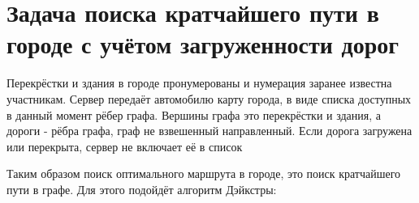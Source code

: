 \section{Задача поиска кратчайшего пути в городе с учётом загруженности дорог}

Перекрёстки и здания в городе пронумерованы и нумерация заранее известна участникам. Сервер передаёт автомобилю карту города, в виде списка доступных в данный момент рёбер графа. Вершины графа это перекрёстки и здания, а дороги - рёбра графа, граф не взвешенный направленный. Если дорога загружена или перекрыта, сервер не включает её в список

Таким образом поиск оптимального маршрута в городе, это поиск кратчайшего пути в графе. Для этого подойдёт алгоритм Дэйкстры:

